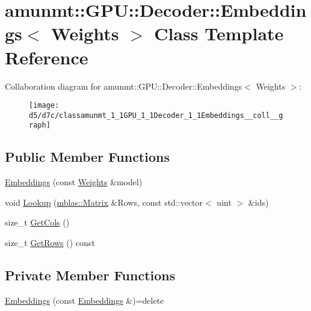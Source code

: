 \hypertarget{classamunmt_1_1GPU_1_1Decoder_1_1Embeddings}{}\section{amunmt\+:\+:G\+PU\+:\+:Decoder\+:\+:Embeddings$<$ Weights $>$ Class Template Reference}
\label{classamunmt_1_1GPU_1_1Decoder_1_1Embeddings}


Collaboration diagram for amunmt\+:\+:G\+PU\+:\+:Decoder\+:\+:Embeddings$<$ Weights $>$\+:
\nopagebreak
\begin{figure}[H]
\begin{center}
\leavevmode
\texttt{[image: d5/d7c/classamunmt\_1\_1GPU\_1\_1Decoder\_1\_1Embeddings\_\_coll\_\_graph]}
\end{center}
\end{figure}
\subsection*{Public Member Functions}
\begin{DoxyCompactItemize}
\item 
\hyperlink{classamunmt_1_1GPU_1_1Decoder_1_1Embeddings_a94b03b0cbce11ec4b1b2b4e2c0ac20b0}{Embeddings} (const \hyperlink{structamunmt_1_1GPU_1_1Weights}{Weights} \&model)
\item 
void \hyperlink{classamunmt_1_1GPU_1_1Decoder_1_1Embeddings_a5c32bbdcdde7a6d814f8599e8d4955a8}{Lookup} (\hyperlink{namespaceamunmt_1_1GPU_1_1mblas_ab67821a8254de53e45a623cf73c0aef6}{mblas\+::\+Matrix} \&Rows, const std\+::vector$<$ uint $>$ \&ids)
\item 
size\+\_\+t \hyperlink{classamunmt_1_1GPU_1_1Decoder_1_1Embeddings_a4fb8ced10c1c7b6107b1da22dd38161a}{Get\+Cols} ()
\item 
size\+\_\+t \hyperlink{classamunmt_1_1GPU_1_1Decoder_1_1Embeddings_ac12423a688365ada8d2a3f744eb40086}{Get\+Rows} () const 
\end{DoxyCompactItemize}
\subsection*{Private Member Functions}
\begin{DoxyCompactItemize}
\item 
\hyperlink{classamunmt_1_1GPU_1_1Decoder_1_1Embeddings_a1995aa26ef329885c0858e9a9afb16ba}{Embeddings} (const \hyperlink{classamunmt_1_1GPU_1_1Decoder_1_1Embeddings}{Embeddings} \&)=delete
\end{DoxyCompactItemize}
